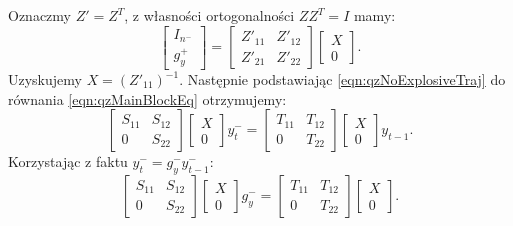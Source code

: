 Oznaczmy $Z' = Z^T$, z własności ortogonalności $ZZ^T = I$ mamy:
\begin{equation}
    \begin{bmatrix}
        I_{n^-} \\
        g_y^+
    \end{bmatrix} = 
    \begin{bmatrix}
    Z'_{11} & Z'_{12} \\
    Z'_{21} & Z'_{22}
    \end{bmatrix}
    \begin{bmatrix}
        X \\
        0
    \end{bmatrix}.
\end{equation}
Uzyskujemy $X = (Z'_{11})^{-1}$. Następnie podstawiając \eqref{eqn:qzNoExplosiveTraj} do równania \eqref{eqn:qzMainBlockEq} otrzymujemy:
\begin{equation}
    \begin{bmatrix}
    S_{11} & S_{12} \\
    0 & S_{22}
    \end{bmatrix}
    \begin{bmatrix}
        X \\
        0
    \end{bmatrix}  y_t^- 
    = 
    \begin{bmatrix}
    T_{11} & T_{12} \\
    0 & T_{22}
    \end{bmatrix} 
    \begin{bmatrix}
        X \\
        0
    \end{bmatrix} y_{t-1}.
\end{equation}
Korzystając z faktu $y_t^- = g_y^- y_{t-1}^-$:
\begin{equation}
    \begin{bmatrix}
    S_{11} & S_{12} \\
    0 & S_{22}
    \end{bmatrix}
    \begin{bmatrix}
        X \\
        0
    \end{bmatrix}  g_y^-
    = 
    \begin{bmatrix}
    T_{11} & T_{12} \\
    0 & T_{22}
    \end{bmatrix} 
    \begin{bmatrix}
        X \\
        0
    \end{bmatrix}.
\end{equation}
